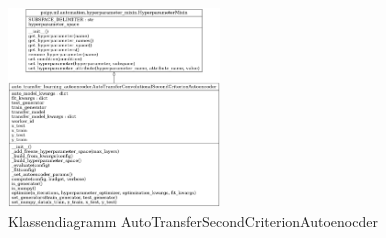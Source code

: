 	\begin{figure}[h]
		\centering
		\includegraphics[width=0.5\textwidth, center]{bilder/Klassendiagramme/Klassendiagramm_AutoTLCSCAE.png}
		\caption[Klassendiagramm AutoTransferSecondCriterionAutoenocder]{Klassendiagramm AutoTransferSecondCriterionAutoenocder}
		\label{img:KlassendiagrammAutoTransferSecondCriterionAutoenocder}
	\end{figure}  